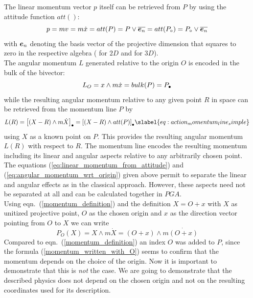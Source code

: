 The linear momentum vector $p$ itself can be retrieved from $P$ by using the attitude
function $att()$:
\begin{equation}
    p = m v = m \dot{x} = att(P) = P \vee \overline{\bm{e}_{n}}
                        = att({P}_\circ) = {P}_\circ \vee \overline{\bm{e}_{n}}
    \label{eq:linear_momentum_from_attitude}
\end{equation}
with $\bm{e}_{n}$ denoting the basis vector of the projective dimension that squares to zero
in the respective algebra ( for $2D$ and  for $3D$). \\

The angular momentum $L$ generated relative to the origin $O$ is encoded in the bulk of
the bivector:
\begin{equation}
    L_{O} = x \wedge m \dot{x} = bulk(P) = {P}_\bullet
    \label{eq:angular_momentum_wrt_origin}
\end{equation}
while the resulting angular momentum relative to any given point $R$ in space can be
retrieved from the momentum line $P$ by
\begin{equation}
    L(R) = \bulk{\left[ (X-R) \wedge m\dot{X} \right]}
         = \bulk{\left[ (X-R) \wedge att(P) \right]}
           \slabel{eq:action_momentum_line_simple}
\end{equation}
using $X$ as a known point on $P$. This provides the resulting angular momentum $L(R)$
with respect to $R$. The momentum line encodes the resulting momentum including its linear
and angular aspects relative to any arbitrarily chosen point. \\

The equations (\ref{eq:linear_momentum_from_attitude}) and
(\ref{eq:angular_momentum_wrt_origin}) given above permit to separate the linear and
angular effects as in the classical approach. However, these aspects need not be separated
at all and can be calculated together in $PGA$.\\

Using eqn.~(\ref{momentum_definition}) and the definition $X=O + x$ with $X$ as unitized
projective point, $O$ as the chosen origin and $x$ as the direction vector pointing from
$O$ to $X$ we can write
\begin{equation}
    P_O(X) = X \wedge m \dot{X} = (O + x) \wedge m \dot{(O + x)}
    \label{momentum_written_with_O}
\end{equation}
Compared to eqn.~(\ref{momentum_definition}) an index $O$ was added to $P$, since the
formula (\ref{momentum_written_with_O}) seems to confirm that the momentum depends on the
choice of the origin. Now it is important to demonstrate  that this is \emph{not} the
case. We are going to demonstrate that the described physics does not depend on the chosen
origin and not on the resulting coordinates used for its description. \\

